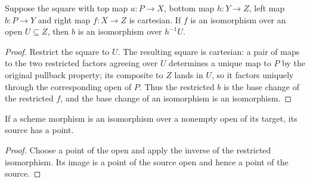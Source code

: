 \begin{lemma}\label{lem:sc0-pullback-open-iso}
\leanok
Suppose the square with top map $a:P\to X$, bottom map $h:Y\to Z$, left map
$b:P\to Y$ and right map $f:X\to Z$ is cartesian. If $f$ is an isomorphism over
an open $U\subseteq Z$, then $b$ is an isomorphism over $h^{-1}U$.
\end{lemma}
\begin{proof}
Restrict the square to $U$. The resulting square is cartesian: a pair of maps to
the two restricted factors agreeing over $U$ determines a unique map to $P$ by
the original pullback property; its composite to $Z$ lands in $U$, so it factors
uniquely through the corresponding open of $P$. Thus the restricted $b$ is the
base change of the restricted $f$, and the base change of an isomorphism is an
isomorphism.
\end{proof}

\begin{lemma}\label{lem:sc0-open-iso-source-point}
\leanok
If a scheme morphism is an isomorphism over a nonempty open of its target, its
source has a point.
\end{lemma}
\begin{proof}
Choose a point of the open and apply the inverse of the restricted isomorphism.
Its image is a point of the source open and hence a point of the source.
\end{proof}
